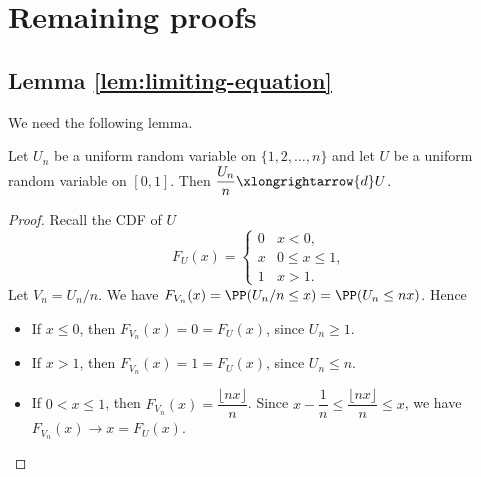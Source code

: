\section{Remaining proofs}

\subsection{Lemma \ref{lem:limiting-equation}}
\label{subsec:proof-limiting-equation}

We need the following lemma.

\begin{lemma}
  \label{lemma:average_uniform_convergence}
  Let $U_n$ be a uniform random variable on $\{1, 2, \ldots, n\}$ and let $U$ be a uniform random variable on $[0,1]$. Then $\dfrac{U_n}{n}\xlongrightarrow{d} U$.
\end{lemma}

\begin{proof}
  Recall the CDF of $U$
  $$F_U(x) = \begin{cases}
      0 & x < 0,         \\
      x & 0 \le x \le 1, \\
      1 & x > 1.
    \end{cases}$$
  Let $V_n = U_n/n$. We have $F_{V_n}(x) = \PP(U_n/n \le x) = \PP(U_n\le nx)$. Hence
  \begin{itemize}
    \item If $x\le 0$, then $F_{V_n}(x) = 0 = F_U(x)$, since $U_n\ge 1$.
    \item If $x > 1$, then $F_{V_n}(x) = 1 = F_U(x)$, since $U_n\le n$.
    \item If $0 < x \le 1$, then $F_{V_n}(x) = \dfrac{\lfloor nx \rfloor}{n}$. Since $x - \dfrac{1}{n} \le \dfrac{\lfloor nx \rfloor}{n} \le x$, we have $F_{V_n}(x) \to x = F_U(x)$.
  \end{itemize}
\end{proof}


